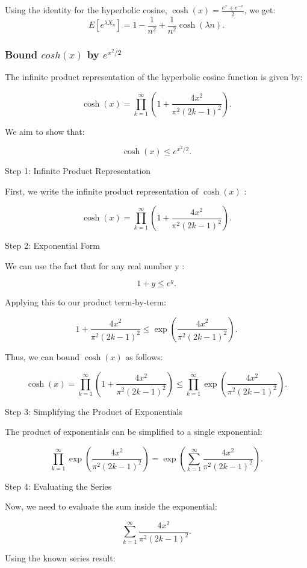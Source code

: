 \documentclass[a4 paper]{article}
\theoremstyle{boldStyle}
\theoremstyle{boldBlueStyle}
\theoremstyle{boldPurpleStyle}
\theoremstyle{boldRedStyle}
\begin{document}
\begin{enumerate}
Using the identity for the hyperbolic cosine, $\cosh(x) = \frac{e^x + e^{-x}}{2}$, we get:
\[
E[e^{\lambda X_n}] = 1 - \frac{1}{n^2} + \frac{1}{n^2} \cosh(\lambda n).
\]

\subsubsection*{Bound $cosh(x)$ by $e^{x^2/2}$}


The infinite product representation of the hyperbolic cosine function is given by:

\[
  \cosh(x) = \prod_{k=1}^{\infty} \left( 1 + \frac{4x^2}{\pi^2 (2k - 1)^2} \right).
\]

We aim to show that:

\[
\cosh(x) \leq e^{x^2 / 2}.
\]

Step 1: Infinite Product Representation

First, we write the infinite product representation of  $\cosh(x)$ :

\[
\cosh(x) = \prod_{k=1}^{\infty} \left( 1 + \frac{4x^2}{\pi^2 (2k - 1)^2} \right).
\]

Step 2: Exponential Form

We can use the fact that for any real number  y :

\[
1 + y \leq e^y.
\]

Applying this to our product term-by-term:

\[
1 + \frac{4x^2}{\pi^2 (2k - 1)^2} \leq \exp\left( \frac{4x^2}{\pi^2 (2k - 1)^2} \right).
\]

Thus, we can bound  $\cosh(x)$  as follows:

\[
\cosh(x) = \prod_{k=1}^{\infty} \left( 1 + \frac{4x^2}{\pi^2 (2k - 1)^2} \right) \leq \prod_{k=1}^{\infty} \exp\left( \frac{4x^2}{\pi^2 (2k - 1)^2} \right).
\]

Step 3: Simplifying the Product of Exponentials

The product of exponentials can be simplified to a single exponential:

\[
\prod_{k=1}^{\infty} \exp\left( \frac{4x^2}{\pi^2 (2k - 1)^2} \right) = \exp\left( \sum_{k=1}^{\infty} \frac{4x^2}{\pi^2 (2k - 1)^2} \right).
\]

Step 4: Evaluating the Series

Now, we need to evaluate the sum inside the exponential:

\[
\sum_{k=1}^{\infty} \frac{4x^2}{\pi^2 (2k - 1)^2}.
\]

Using the known series result:


\end{enumerate}
\end{document}
